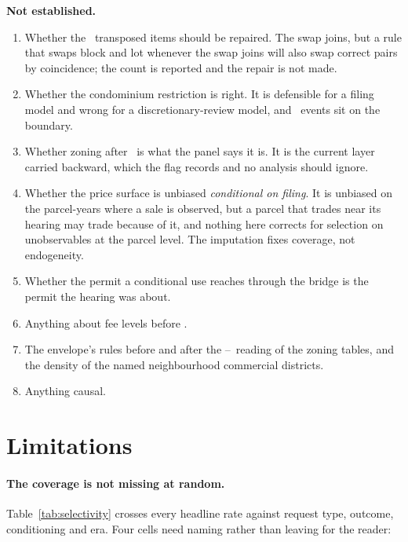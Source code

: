 \documentclass[11pt]{article}
\begin{document}
\textbf{Not established.}
\begin{enumerate}
\item Whether the \acqHandTransposed\ transposed items should be repaired. The swap joins, but
a rule that swaps block and lot whenever the swap joins will also swap correct pairs by
coincidence; the count is reported and the repair is not made.
\item Whether the condominium restriction is right. It is defensible for a filing model and
wrong for a discretionary-review model, and \acqRiskCondoLost\ events sit on the boundary.
\item Whether zoning after \acqSnapshotFirst\ is what the panel says it is. It is the current
layer carried backward, which the flag records and no analysis should ignore.
\item Whether the price surface is unbiased \emph{conditional on filing}. It is unbiased on
the parcel-years where a sale is observed, but a parcel that trades near its hearing may trade
because of it, and nothing here corrects for selection on unobservables at the parcel level.
The imputation fixes coverage, not endogeneity.
\item Whether the permit a conditional use reaches through the bridge is the permit the
hearing was about.
\item Anything about fee levels before \acqFeeFirst.
\item The envelope's rules before and after the \envReadFrom--\envReadTo\ reading of the zoning tables, and the
density of the named neighbourhood commercial districts.
\item Anything causal.
\end{enumerate}

\section{Limitations}
\label{sec:limits}

\paragraph{The coverage is not missing at random.} Table~\ref{tab:selectivity} crosses every
headline rate against request type, outcome, conditioning and era. Four cells need naming
rather than leaving for the reader:
\end{document}
